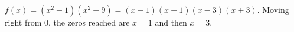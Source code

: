 $f(x)=\left(x^2-1\right)\left(x^2-9\right)=(x-1)(x+1)(x-3)(x+3)$. Moving right from $0$, the zeros reached are $x=\boxed{1}$ and then $x=\boxed{3}$.
